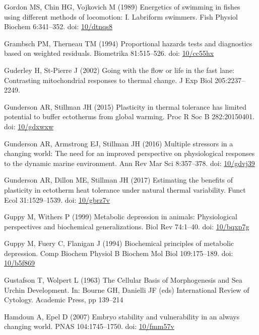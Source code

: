 \documentclass[a4paper,10pt, oneside]{memoir}
\begin{document}
\leavevmode\hypertarget{ref-Gordon1989}{}%
Gordon MS, Chin HG, Vojkovich M (1989) Energetics of swimming in fishes using different methods of locomotion: I. Labriform swimmers. Fish Physiol Biochem 6:341--352. doi: \href{https://doi.org/10/dtnqs8}{10/dtnqs8}

\leavevmode\hypertarget{ref-Grambsch1994}{}%
Grambsch PM, Therneau TM (1994) Proportional hazards tests and diagnostics based on weighted residuals. Biometrika 81:515--526. doi: \href{https://doi.org/10/cc55hx}{10/cc55hx}

\leavevmode\hypertarget{ref-Guderley2002}{}%
Guderley H, St-Pierre J (2002) Going with the flow or life in the fast lane: Contrasting mitochondrial responses to thermal change. J Exp Biol 205:2237--2249.

\leavevmode\hypertarget{ref-Gunderson2015}{}%
Gunderson AR, Stillman JH (2015) Plasticity in thermal tolerance has limited potential to buffer ectotherms from global warming. Proc R Soc B 282:20150401. doi: \href{https://doi.org/10/gdxwxw}{10/gdxwxw}

\leavevmode\hypertarget{ref-Gunderson2016}{}%
Gunderson AR, Armstrong EJ, Stillman JH (2016) Multiple stressors in a changing world: The need for an improved perspective on physiological responses to the dynamic marine environment. Ann Rev Mar Sci 8:357--378. doi: \href{https://doi.org/10/gdvj39}{10/gdvj39}

\leavevmode\hypertarget{ref-Gunderson2017}{}%
Gunderson AR, Dillon ME, Stillman JH (2017) Estimating the benefits of plasticity in ectotherm heat tolerance under natural thermal variability. Funct Ecol 31:1529--1539. doi: \href{https://doi.org/10/gbrz7v}{10/gbrz7v}

\leavevmode\hypertarget{ref-Guppy1999}{}%
Guppy M, Withers P (1999) Metabolic depression in animals: Physiological perspectives and biochemical generalizations. Biol Rev 74:1--40. doi: \href{https://doi.org/10/bqxp7g}{10/bqxp7g}

\leavevmode\hypertarget{ref-Guppy1994}{}%
Guppy M, Fuery C, Flanigan J (1994) Biochemical principles of metabolic depression. Comp Biochem Physiol B Biochem Mol Biol 109:175--189. doi: \href{https://doi.org/10/b5f869}{10/b5f869}

\leavevmode\hypertarget{ref-Gustafson1963}{}%
Gustafson T, Wolpert L (1963) The Cellular Basis of Morphogenesis and Sea Urchin Development. In: Bourne GH, Danielli JF (eds) International Review of Cytology. Academic Press, pp 139--214

\leavevmode\hypertarget{ref-Hamdoun2007}{}%
Hamdoun A, Epel D (2007) Embryo stability and vulnerability in an always changing world. PNAS 104:1745--1750. doi: \href{https://doi.org/10/fmm57v}{10/fmm57v}
\end{document}
